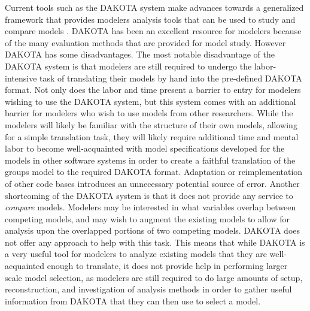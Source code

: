 Current tools such as the DAKOTA system make advances towards a generalized framework that provides modelers analysis tools that can be used to study and compare models \citep{adams2009dakota}.
DAKOTA has been an excellent resource for modelers because of the many evaluation methods that are provided for model study.
However DAKOTA has some disadvantages.
The most notable disadvantage of the DAKOTA system is that modelers are still required to undergo the labor-intensive task of translating their models by hand into the pre-defined DAKOTA format.
Not only does the labor and time present a barrier to entry for modelers wishing to use the DAKOTA system, but this system comes with an additional barrier for modelers who wish to use models from other researchers.
While the modelers will likely be familiar with the structure of their own models, allowing for a simple translation task, they will likely require additional time and mental labor to become well-acquainted with model specifications developed for the models in other software systems in order to create a faithful translation of the groups model to the required DAKOTA format.
Adaptation or reimplementation of other code bases introduces an unnecessary potential source of error.
Another shortcoming of the DAKOTA system is that it does not provide any service to \emph{compare} models.
Modelers may be interested in what variables overlap between competing models, and may wish to augment the existing models to allow for analysis upon the overlapped portions of two competing models.
DAKOTA does not offer any approach to help with this task.
This means that while DAKOTA is a very useful tool for modelers to analyze existing models that they are well-acquainted enough to translate, it does not provide help in performing larger scale model selection, as modelers are still required to do large amounts of setup, reconstruction, and investigation of analysis methods in order to gather useful information from DAKOTA that they can then use to select a model.

